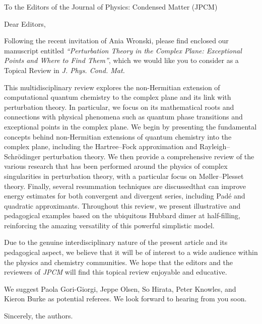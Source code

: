 \documentclass[10pt]{letter}
\begin{document}
\begin{letter}%
{To the Editors of the Journal of Physics: Condensed Matter (JPCM)}

\opening{Dear Editors,}

\justifying
Following the recent invitation of Ania Wronski, please find enclosed our manuscript entitled \textit{``Perturbation Theory in the Complex Plane: Exceptional Points and Where to Find Them''}, which we would like you to consider as a Topical Review in \textit{J. Phys. Cond. Mat.}

This multidisciplinary review explores the non-Hermitian extension of computational quantum chemistry to the complex plane and its link with perturbation theory.
In particular, we focus on its mathematical roots and connections with physical phenomena such as quantum phase transitions and exceptional points in the complex plane.
We begin by presenting the fundamental concepts behind non-Hermitian extensions of quantum chemistry into the complex plane, including the Hartree--Fock approximation and
Rayleigh--Schr\"odinger perturbation theory. 
We then provide a comprehensive review of the various research that has been performed around the physics of complex singularities in perturbation theory, with a particular focus on M{\o}ller--Plesset theory.
Finally, several resummation techniques are discussedthat can improve energy estimates for both convergent and divergent series, including Pad\'e and quadratic approximants.
Throughout this review, we present illustrative and pedagogical examples based on the ubiquitous Hubbard dimer at half-filling, reinforcing the amazing versatility of this powerful simplistic model.

Due to the genuine interdisciplinary nature of the present article and its pedagogical aspect, we believe that it will be of interest to a wide audience within the physics and chemistry communities.
We hope that the editors and the reviewers of \textit{JPCM} will find this topical review enjoyable and educative.

We suggest Paola Gori-Giorgi, Jeppe Olsen, So Hirata, Peter Knowles, and Kieron Burke as potential referees.
We look forward to hearing from you soon.

\closing{Sincerely, the authors.}


\end{letter}
\end{document}
